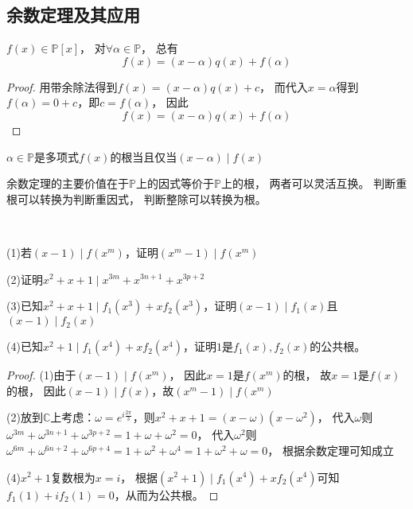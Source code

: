 \subsection{余数定理及其应用}

\begin{theorem}[余数定理]
  $f(x) \in \mathbb{P}[x]$，
  对$\forall \alpha \in \mathbb{P}$，
  总有
  \begin{equation*}
    f(x) = (x - \alpha)q(x) + f(\alpha)
  \end{equation*}
\end{theorem}

\begin{proof}
  用带余除法得到$f(x) = (x - \alpha)q(x) + c$，
  而代入$x = \alpha$得到$f(\alpha) = 0 + c$，即$c = f(\alpha)$，
  因此
  \begin{equation*}
    f(x) = (x - \alpha)q(x) + f(\alpha)
  \end{equation*}
\end{proof}

\begin{corollary}
  $\alpha \in \mathbb{P}$是多项式$f(x)$的根当且仅当$(x-\alpha)\mid f(x)$
\end{corollary}

\begin{note}
  余数定理的主要价值在于$\mathbb{P}$上的因式等价于$\mathbb{P}$上的根，
  两者可以灵活互换。
  判断重根可以转换为判断重因式，
  判断整除可以转换为根。
\end{note}

~

\begin{exercise}[余数定理的应用]
  (1)若$(x - 1)\mid f(x^m)$，证明$(x^m - 1) \mid f(x^m)$

  (2)证明$x^2 + x + 1 \mid x^{3m} + x^{3n+1} + x^{3p+2}$

  (3)已知$x^2 + x + 1 \mid f_1(x^3) + xf_2(x^3)$，证明$(x - 1)\mid f_1(x)$且$(x - 1)\mid f_2(x)$

  (4)已知$x^2 + 1 \mid f_1(x^4) + xf_2(x^4)$，证明$1$是$f_1(x),f_2(x)$的公共根。
\end{exercise}

\begin{proof}
  (1)由于$(x - 1) \mid f(x^m)$，
  因此$x = 1$是$f(x^m)$的根，
  故$x = 1$是$f(x)$的根，
  因此$(x - 1) \mid f(x)$，故$(x^m - 1) \mid f(x^m)$

  (2)放到$\mathbb{C}$上考虑：$\omega = e^{i\frac{2\pi}{3}}$，则$x^2 + x + 1 = (x - \omega)(x - \omega^2)$，
  代入$\omega$则$\omega^{3m} + \omega^{3n+1} + \omega^{3p+2} = 1 + \omega + \omega^2 = 0$，
  代入$\omega^2$则$\omega^{6m} + \omega^{6n + 2} + \omega^{6p + 4} = 1 + \omega^2 + \omega^4 = 1 + \omega^2 + \omega = 0$，
  根据余数定理可知成立

  (4)$x^2 + 1$复数根为$x = i$，
  根据$(x^2 + 1) \mid f_1(x^4) + x f_2(x^4)$可知$f_1(1) + i f_2(1) = 0$，从而为公共根。
\end{proof}



